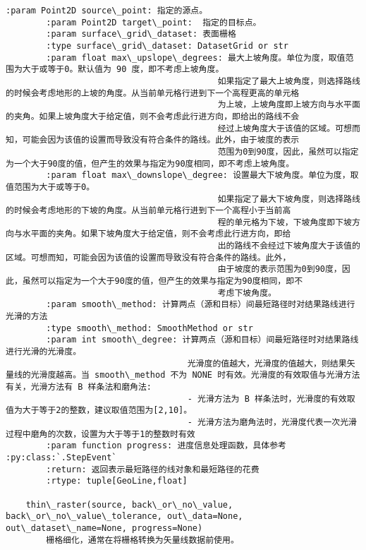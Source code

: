 \documentclass[11pt]{article}
\begin{document}
\begin{Verbatim}[commandchars=\\\{\}]
        :param Point2D source\_point: 指定的源点。
        :param Point2D target\_point:  指定的目标点。
        :param surface\_grid\_dataset: 表面栅格
        :type surface\_grid\_dataset: DatasetGrid or str
        :param float max\_upslope\_degrees: 最大上坡角度。单位为度，取值范围为大于或等于0。默认值为 90 度，即不考虑上坡角度。
                                          如果指定了最大上坡角度，则选择路线的时候会考虑地形的上坡的角度。从当前单元格行进到下一个高程更高的单元格
                                          为上坡，上坡角度即上坡方向与水平面的夹角。如果上坡角度大于给定值，则不会考虑此行进方向，即给出的路线不会
                                          经过上坡角度大于该值的区域。可想而知，可能会因为该值的设置而导致没有符合条件的路线。此外，由于坡度的表示
                                          范围为0到90度，因此，虽然可以指定为一个大于90度的值，但产生的效果与指定为90度相同，即不考虑上坡角度。
        :param float max\_downslope\_degree: 设置最大下坡角度。单位为度，取值范围为大于或等于0。
                                          如果指定了最大下坡角度，则选择路线的时候会考虑地形的下坡的角度。从当前单元格行进到下一个高程小于当前高
                                          程的单元格为下坡，下坡角度即下坡方向与水平面的夹角。如果下坡角度大于给定值，则不会考虑此行进方向，即给
                                          出的路线不会经过下坡角度大于该值的区域。可想而知，可能会因为该值的设置而导致没有符合条件的路线。此外，
                                          由于坡度的表示范围为0到90度，因此，虽然可以指定为一个大于90度的值，但产生的效果与指定为90度相同，即不
                                          考虑下坡角度。
        :param smooth\_method: 计算两点（源和目标）间最短路径时对结果路线进行光滑的方法
        :type smooth\_method: SmoothMethod or str
        :param int smooth\_degree: 计算两点（源和目标）间最短路径时对结果路线进行光滑的光滑度。
                                    光滑度的值越大，光滑度的值越大，则结果矢量线的光滑度越高。当 smooth\_method 不为 NONE 时有效。光滑度的有效取值与光滑方法有关，光滑方法有 B 样条法和磨角法:
                                    - 光滑方法为 B 样条法时，光滑度的有效取值为大于等于2的整数，建议取值范围为[2,10]。
                                    - 光滑方法为磨角法时，光滑度代表一次光滑过程中磨角的次数，设置为大于等于1的整数时有效
        :param function progress: 进度信息处理函数，具体参考 :py:class:`.StepEvent`
        :return: 返回表示最短路径的线对象和最短路径的花费
        :rtype: tuple[GeoLine,float]
    
    thin\_raster(source, back\_or\_no\_value, back\_or\_no\_value\_tolerance, out\_data=None, out\_dataset\_name=None, progress=None)
        栅格细化，通常在将栅格转换为矢量线数据前使用。
        

\end{Verbatim}
\end{document}
